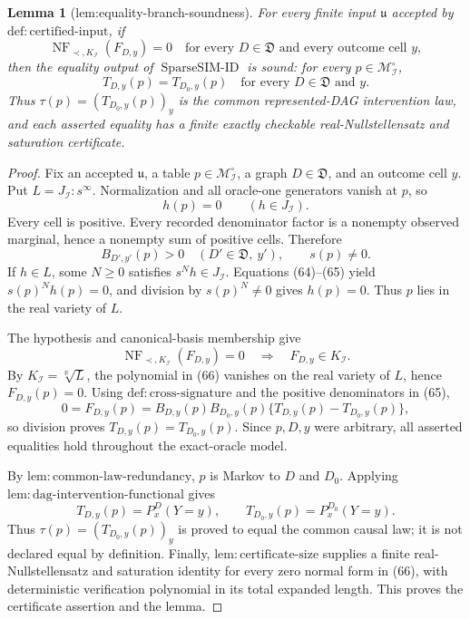 \documentclass{article}
\newtheorem{lemma}{Lemma}
\begin{document}
\begin{lemma}[lem:equality-branch-soundness]\label{lem:equality-branch-soundness}
For every finite input \(\mathfrak u\) accepted by \(\mathrm{def{:}certified\text{-}input}\), if
\[
 \operatorname{NF}_{\prec,K_{\mathcal I}}(F_{D,y})=0
 \quad\text{for every }D\in\mathfrak D\text{ and every outcome cell }y,
\]
then the equality output of \(\operatorname{SparseSIM\text{-}ID}\) is sound: for every \(p\in\mathcal M_{\mathcal I}^{\circ}\),
\[
 T_{D,y}(p)=T_{D_0,y}(p)
 \quad\text{for every }D\in\mathfrak D\text{ and }y.
\]
Thus \(\tau(p)=(T_{D_0,y}(p))_y\) is the common represented-DAG intervention law, and each asserted equality has a finite exactly checkable real-Nullstellensatz and saturation certificate.
\end{lemma}
\begin{proof}
Fix an accepted \(\mathfrak u\), a table \(p\in\mathcal M_{\mathcal I}^{\circ}\), a graph \(D\in\mathfrak D\), and an outcome cell \(y\).  Put \(L=J_{\mathcal I}:s^\infty\).  Normalization and all oracle-one generators vanish at \(p\), so
\[
 h(p)=0\qquad(h\in J_{\mathcal I}). \tag{64}
\]
Every cell is positive.  Every recorded denominator factor is a nonempty observed marginal, hence a nonempty sum of positive cells.  Therefore
\[
 B_{D',y'}(p)>0\quad(D'\in\mathfrak D,\ y'),
 \qquad s(p)\neq0. \tag{65}
\]
If \(h\in L\), some \(N\geq0\) satisfies \(s^Nh\in J_{\mathcal I}\).  Equations (64)--(65) yield \(s(p)^Nh(p)=0\), and division by \(s(p)^N\neq0\) gives \(h(p)=0\).  Thus \(p\) lies in the real variety of \(L\).

The hypothesis and canonical-basis membership give
\[
 \operatorname{NF}_{\prec,K_{\mathcal I}}(F_{D,y})=0
 \quad\Longrightarrow\quad F_{D,y}\in K_{\mathcal I}. \tag{66}
\]
By \(K_{\mathcal I}=\sqrt[\mathbb R]{L}\), the polynomial in (66) vanishes on the real variety of \(L\), hence \(F_{D,y}(p)=0\).  Using \(\mathrm{def{:}cross\text{-}signature}\) and the positive denominators in (65),
\[
 0=F_{D,y}(p)
 =B_{D,y}(p)B_{D_0,y}(p)
 \{T_{D,y}(p)-T_{D_0,y}(p)\}, \tag{67}
\]
so division proves \(T_{D,y}(p)=T_{D_0,y}(p)\).  Since \(p,D,y\) were arbitrary, all asserted equalities hold throughout the exact-oracle model.

By \(\mathrm{lem{:}common\text{-}law\text{-}redundancy}\), \(p\) is Markov to \(D\) and \(D_0\).  Applying \(\mathrm{lem{:}dag\text{-}intervention\text{-}functional}\) gives
\[
 T_{D,y}(p)=P_x^D(Y=y),
 \qquad T_{D_0,y}(p)=P_x^{D_0}(Y=y). \tag{68}
\]
Thus \(\tau(p)=(T_{D_0,y}(p))_y\) is proved to equal the common causal law; it is not declared equal by definition.  Finally, \(\mathrm{lem{:}certificate\text{-}size}\) supplies a finite real-Nullstellensatz and saturation identity for every zero normal form in (66), with deterministic verification polynomial in its total expanded length.  This proves the certificate assertion and the lemma.
\end{proof}
\end{document}
